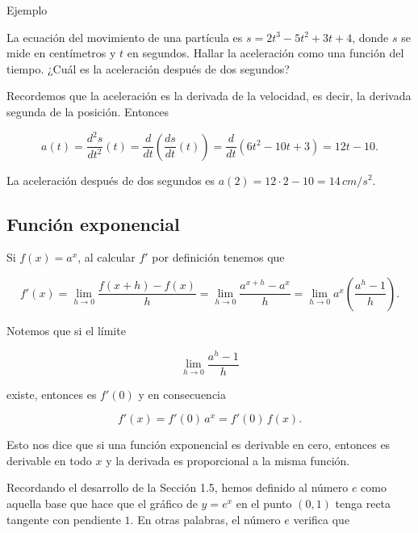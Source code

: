 \documentclass[
  letterpaper,
]{book}
\theoremstyle{plain}
\theoremstyle{remark}
\begin{document}
Ejemplo

La ecuación del movimiento de una partícula es \(s=2t^3-5t^2+3t+4\),
donde \(s\) se mide en centímetros y \(t\) en segundos. Hallar la
aceleración como una función del tiempo. ¿Cuál es la aceleración después
de dos segundos?

\begin{tcolorbox}[enhanced jigsaw, opacityback=0, left=2mm, opacitybacktitle=0.6, toprule=.15mm, bottomrule=.15mm, colbacktitle=quarto-callout-tip-color!10!white, titlerule=0mm, bottomtitle=1mm, title=\textcolor{quarto-callout-tip-color}{\faLightbulb}\hspace{0.5em}{Solución}, toptitle=1mm, colframe=quarto-callout-tip-color-frame, colback=white, breakable, rightrule=.15mm, arc=.35mm, leftrule=.75mm, coltitle=black]

Recordemos que la aceleración es la derivada de la velocidad, es decir,
la derivada segunda de la posición. Entonces

\[
a(t)=\frac{d^2 s}{dt^2}(t)=\frac{d}{dt}\left(\frac{ds}{dt}(t)\right)=\frac{d}{dt}\left(6t^2-10t+3\right)=12t-10.
\]

La aceleración después de dos segundos es
\(a(2)=12\cdot 2-10=14\, cm/s^2\).

\end{tcolorbox}

\subsection{Función exponencial}\label{funciuxf3n-exponencial}

Si \(f(x)=a^x\), al calcular \(f'\) por definición tenemos que

\[
f'(x)=\lim_{h\to 0} \frac{f(x+h)-f(x)}{h}=\lim_{h\to 0} \frac{a^{x+h}-a^x}{h}=\lim_{h\to 0} a^x\left(\frac{a^h-1}{h}\right).
\]

Notemos que si el límite

\[
\lim_{h\to 0} \frac{a^h-1}{h}
\]

existe, entonces es \(f'(0)\) y en consecuencia

\[
f'(x)=f'(0) \,a^x=f'(0)\,f(x).
\]

Esto nos dice que si una función exponencial es derivable en cero,
entonces es derivable en todo \(x\) y la derivada es proporcional a la
misma función.

Recordando el desarrollo de la Sección 1.5, hemos definido al número
\(e\) como aquella base que hace que el gráfico de \(y=e^x\) en el punto
\((0,1)\) tenga recta tangente con pendiente \(1\). En otras palabras,
el número \(e\) verifica que
\end{document}
